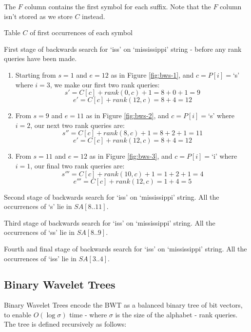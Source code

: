 The $F$ column contains the first symbol for each suffix. Note that the $F$ 
column isn't stored as we store $C$ instead.

			{Table $C$ of first occurrences of each symbol}
			
			{First stage of backwards search for `iss' on `mississippi'
			 string - before any rank queries have been made.}


\begin{enumerate}
	\item
		Starting from $s = 1$ and $e = 12$ as in Figure \ref{fig:bws-1},
		and $c = P[i] = $`s' where $i = 3$, we make our first two rank queries:
			$$s' = C[c] + rank(0, c) + 1 = 8 + 0 + 1 = 9$$
			$$e' = C[c] + rank(12, c) = 8 + 4 = 12$$
	\item
		From $s = 9$ and $e = 11$ as in Figure \ref{fig:bws-2},
		and $c = P[i] = $`s' where $i = 2$, our next two rank queries are:
			$$s'' = C[c] + rank(8, c) + 1 = 8 + 2 + 1 = 11$$
			$$e' = C[c] + rank(12, c) = 8 + 4 = 12$$
	\item
		From $s = 11$ and $e = 12$ as in Figure \ref{fig:bws-3},
		and $c = P[i] = $`i' where $i = 1$, our final two rank queries are:
			$$s''' = C[c] + rank(10, c) + 1 = 1 + 2 + 1 = 4$$
			$$e''' = C[c] + rank(12, c) = 1 + 4 = 5$$
\end{enumerate}

			{Second stage of backwards search for `iss' on `mississippi'
			string. All the occurrences of `s' lie in $SA[8..11]$.}

			{Third stage of backwards search for `iss' on `mississippi'
			string. All the occurrences of `ss' lie in $SA[8..9]$.}

			{Fourth and final stage of backwards search for `iss' on
			`mississippi' string. All the occurrences of `iss' lie in
			$SA[3..4]$.}

\clearpage
\subsection{Binary Wavelet Trees}
Binary Wavelet Trees encode the BWT as a balanced binary tree of bit vectors, to 
enable $O(\log \sigma)$ time - where $\sigma$ is the size of the alphabet - rank 
queries. The tree is defined recursively as follows:

